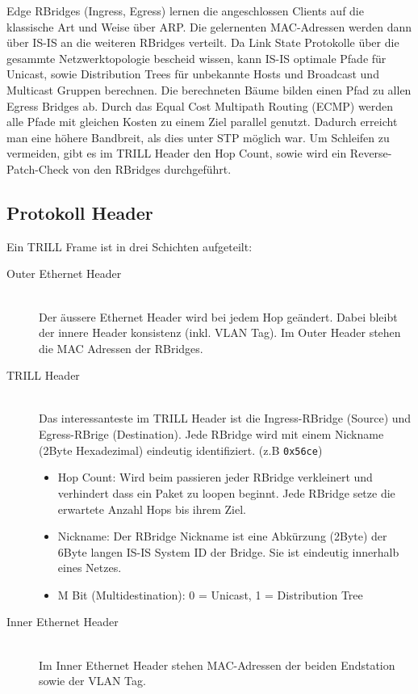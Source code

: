 Edge RBridges (Ingress, Egress) lernen die angeschlossen Clients auf die klassische Art und Weise über ARP. Die gelernenten MAC-Adressen werden dann über IS-IS an die weiteren RBridges verteilt. Da Link State Protokolle über die gesammte Netzwerktopologie bescheid wissen, kann IS-IS optimale Pfade für Unicast, sowie Distribution Trees für unbekannte Hosts und Broadcast und Multicast Gruppen berechnen. Die berechneten Bäume bilden einen Pfad zu allen Egress Bridges ab. Durch das Equal Cost Multipath Routing (ECMP) werden alle Pfade mit gleichen Kosten zu einem Ziel parallel genutzt. Dadurch erreicht man eine höhere Bandbreit, als dies unter STP möglich war. Um Schleifen zu vermeiden, gibt es im TRILL Header den Hop Count, sowie wird ein Reverse-Patch-Check von den RBridges durchgeführt.

\subsection{Protokoll Header}
Ein TRILL Frame ist in drei Schichten aufgeteilt:
\begin{description}
	\item[Outer Ethernet Header] \hfill \\
	Der äussere Ethernet Header wird bei jedem Hop geändert. Dabei bleibt der innere Header konsistenz (inkl. VLAN Tag). Im Outer Header stehen die MAC Adressen der RBridges.
	\item[TRILL Header] \hfill \\
	Das interessanteste im TRILL Header ist die Ingress-RBridge (Source) und Egress-RBrige (Destination). Jede RBridge wird mit einem Nickname (2Byte Hexadezimal) eindeutig identifiziert. (z.B \lstinline[]|0x56ce|) 
	\begin{itemize}
		\item Hop Count: Wird beim passieren jeder RBridge verkleinert und verhindert dass ein Paket zu loopen beginnt. Jede RBridge setze die erwartete Anzahl Hops bis ihrem Ziel.
		\item Nickname: Der RBridge Nickname ist eine Abkürzung (2Byte) der 6Byte langen IS-IS System ID der Bridge. Sie ist eindeutig innerhalb eines Netzes. 
		\item M Bit (Multidestination): 0 = Unicast, 1 = Distribution Tree
	\end{itemize}
	\item[Inner Ethernet Header] \hfill \\
	Im Inner Ethernet Header stehen MAC-Adressen der beiden Endstation sowie der VLAN Tag.
\end{description}

